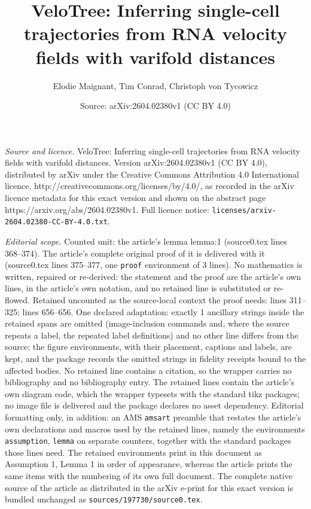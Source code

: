 \documentclass[10pt,a4paper]{amsart}
\title{VeloTree: Inferring single-cell trajectories from RNA velocity fields with varifold distances}
\author{Elodie Maignant, Tim Conrad, Christoph von Tycowicz}
\date{Source: arXiv:2604.02380v1 (CC BY 4.0)}
\begin{document}
\maketitle

\noindent\emph{Source and licence.} VeloTree: Inferring single-cell trajectories from RNA velocity fields with varifold distances. Version arXiv:2604.02380v1 (CC BY 4.0), distributed by arXiv under the Creative Commons Attribution 4.0 International licence, http://creativecommons.org/licenses/by/4.0/, as recorded in the arXiv licence metadata for this exact version and shown on the abstract page https://arxiv.org/abs/2604.02380v1. Full licence notice: \texttt{licenses/arxiv-2604.02380-CC-BY-4.0.txt}.\par\smallskip

\noindent\textit{Editorial scope.} Counted unit: the article's lemma lemma:1 (source0.tex lines 368--374). The article's complete original proof of it is delivered with it (source0.tex lines 375--377, one \texttt{proof} environment of 3 lines). No mathematics is written, repaired or re-derived: the statement and the proof are the article's own lines, in the article's own notation, and no retained line is substituted or re-flowed.  Retained uncounted as the source-local context the proof needs: lines 311--325; lines 656--656.  One declared adaptation: exactly 1 ancillary strings inside the retained spans are omitted (image-inclusion commands and, where the source repeats a label, the repeated label definitions) and no other line differs from the source; the figure environments, with their placement, captions and labels, are kept, and the package records the omitted strings in fidelity receipts bound to the affected bodies.  No retained line contains a citation, so the wrapper carries no bibliography and no bibliography entry.  The retained lines contain the article's own diagram code, which the wrapper typesets with the standard tikz packages; no image file is delivered and the package declares no asset dependency.  Editorial formatting only, in addition: an AMS \texttt{amsart} preamble that restates the article's own declarations and macros used by the retained lines, namely the environments \texttt{assumption}, \texttt{lemma} on separate counters, together with the standard packages those lines need.  The retained environments print in this document as Assumption 1, Lemma 1 in order of appearance, whereas the article prints the same items with the numbering of its own full document.  The complete native source of the article as distributed in the arXiv e-print for this exact version is bundled unchanged as \texttt{sources/197730/source0.tex}.
\end{document}
